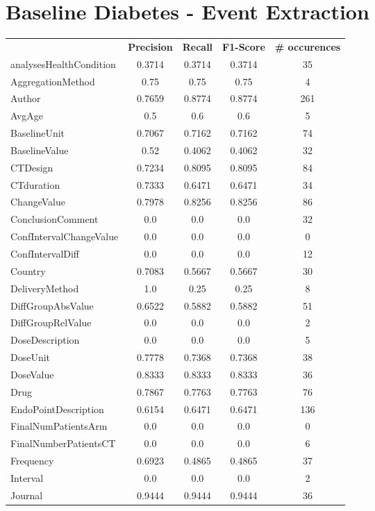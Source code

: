 \section{Baseline Diabetes - Event Extraction}
\begin{longtable}{ l c c c c}
 & \textbf{Precision} & \textbf{Recall} & \textbf{F1-Score} & \textbf{\# occurences} \\ \cline{1-5}
analysesHealthCondition & 0.3714 & 0.3714 & 0.3714 & 35\\
AggregationMethod & 0.75 & 0.75 & 0.75 & 4\\
Author & 0.7659 & 0.8774 & 0.8774 & 261\\
AvgAge & 0.5 & 0.6 & 0.6 & 5\\
BaselineUnit & 0.7067 & 0.7162 & 0.7162 & 74\\
BaselineValue & 0.52 & 0.4062 & 0.4062 & 32\\
CTDesign & 0.7234 & 0.8095 & 0.8095 & 84\\
CTduration & 0.7333 & 0.6471 & 0.6471 & 34\\
ChangeValue & 0.7978 & 0.8256 & 0.8256 & 86\\
ConclusionComment & 0.0 & 0.0 & 0.0 & 32\\
ConfIntervalChangeValue & 0.0 & 0.0 & 0.0 & 0\\
ConfIntervalDiff & 0.0 & 0.0 & 0.0 & 12\\
Country & 0.7083 & 0.5667 & 0.5667 & 30\\
DeliveryMethod & 1.0 & 0.25 & 0.25 & 8\\
DiffGroupAbsValue & 0.6522 & 0.5882 & 0.5882 & 51\\
DiffGroupRelValue & 0.0 & 0.0 & 0.0 & 2\\
DoseDescription & 0.0 & 0.0 & 0.0 & 5\\
DoseUnit & 0.7778 & 0.7368 & 0.7368 & 38\\
DoseValue & 0.8333 & 0.8333 & 0.8333 & 36\\
Drug & 0.7867 & 0.7763 & 0.7763 & 76\\
EndoPointDescription & 0.6154 & 0.6471 & 0.6471 & 136\\
FinalNumPatientsArm & 0.0 & 0.0 & 0.0 & 0\\
FinalNumberPatientsCT & 0.0 & 0.0 & 0.0 & 6\\
Frequency & 0.6923 & 0.4865 & 0.4865 & 37\\
Interval & 0.0 & 0.0 & 0.0 & 2\\
Journal & 0.9444 & 0.9444 & 0.9444 & 36\\

\end{longtable}

